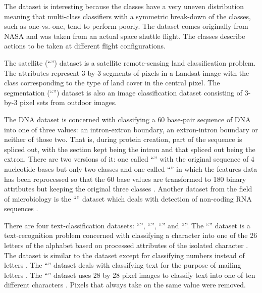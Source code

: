 The  dataset is interesting because 
the classes have a very uneven distribution meaning that multi-class
classifiers
with a symmetric break-down of the classes, 
such as one-vs.-one,
tend to perform poorly.
The  dataset comes originally
from NASA and was taken from an actual space shuttle flight.
The classes describe actions to be taken at different flight configurations.

The satellite (``'') dataset is a satellite remote-sensing land classification problem.
The attributes represent 3-by-3 segments of pixels in a Landsat 
image with the class corresponding to the type of land cover in the central pixel.
The segmentation (``'') dataset is also an image classification dataset consisting of 3-by-3
pixel sets from outdoor images.

The DNA dataset is concerned with classifying a 60 base-pair sequence of DNA into
one of three values: an intron-extron boundary, an extron-intron boundary or
neither of those two.
That is, during protein creation, part of the sequence is spliced out, with
the section kept being the intron and that spliced out being the extron.
There are two versions of it: one called ``'' with the original 
sequence of 4 nucleotide bases but only two classes 
and one called ``'' in which
the features data has been reprocessed so that
the 60 base values are transformed to 180 binary attributes but keeping the
original three classes \citep{Michie_etal1994}.
Another dataset from the field of microbiology is the ``'' dataset
which deals with detection of non-coding RNA sequences
\citep{Uzilov_etal2006}.

There are four text-classification datasets: ``'', ``'',
``'' and ``''.
The ``'' dataset is a text-recognition problem concerned with classifying
a character into one of the 26 letters of the alphabet based on processed
attributes of the isolated character \citep{Frey_Slate1991}.
The  dataset is similar to the  dataset except for
classifying numbers instead of letters \citep{Alimoglu1996}.
The ``'' dataset deals with classifying text for the purpose of mailing
letters \citep{Hull1994}.
The ``'' dataset uses 28 by 28 pixel images to classify text into one
of ten different characters \citep{LeCun_etal1998}. 
Pixels that always take on the same value were removed.

